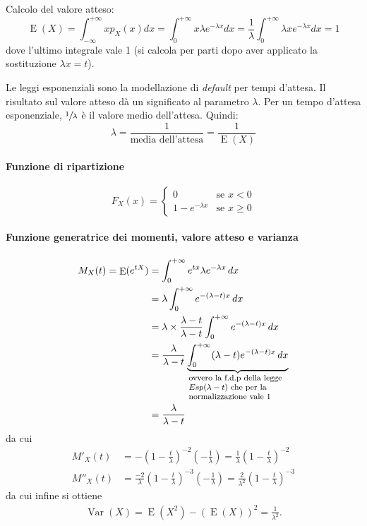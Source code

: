 \documentclass[11pt,a4paper,twoside]{article}
\let\geq\geqslant%
\newcommand\dx{\,dx}
\newcommand{\explain}[2]{\underbrace{#1}_{\parbox{\widthof{\ensuremath{#1}}}{\footnotesize\raggedright #2}}}
\DeclareMathOperator{\Var}{Var}
\DeclareMathOperator{\E}{E}
\begin{document}
Calcolo del valore atteso:
\[
  \E(X) = \int_{-\infty}^{+\infty} x p_X(x) dx = \int_0^{+\infty} x
  \lambda e^{-\lambda x} dx = \frac{1}{\lambda} \int_0^{+\infty}
  \lambda x e^{-\lambda x} dx = 1
\]
dove l'ultimo integrale vale 1 (si calcola per parti dopo aver
applicato la sostituzione \(\lambda x = t\)).

Le leggi esponenziali sono la modellazione di \textit{default} per
tempi d'attesa.  Il risultato sul valore atteso dà un significato al
parametro \(\lambda\). Per un tempo d'attesa esponenziale,
\(\sfrac{1}{\lambda}\) è il valore medio dell'attesa. Quindi:
\[
  \lambda = \frac{1}{\mbox{media dell'attesa}} = \frac{1}{\E(X)}
\]

\paragraph{Funzione di ripartizione}
\[
  F_X(x) = \begin{cases}
    0 &\mbox{se } x < 0 \\
    1-e^{-\lambda x} &\mbox{se } x\geq 0
  \end{cases}
\]

\paragraph{Funzione generatrice dei momenti, valore atteso e varianza}
\begin{align*}
  M_X(t) = \E(e^{tX})
  &= \int_0^{+\infty} e^{tx} \lambda e^{-\lambda x} \dx \\
  &= \lambda \int_0^{+\infty} e^{-(\lambda - t)x} \dx \\
  &= \lambda \times \frac{\lambda -t}{\lambda -t} \int_0^{+\infty} e^{-(\lambda - t)x} \dx \\
  &= \frac{\lambda}{\lambda - t}
    \explain{\int_0^{+\infty} (\lambda -t)e^{-(\lambda -t)x} \dx}
    {ovvero la f.d.p\ della legge \(Esp(\lambda -t)\) che per la normalizzazione vale 1}\\
  &= \frac{\lambda}{\lambda -t}
\end{align*}
da cui
\begin{align*}
  M'_X(t)
  &= - \left( 1 - \frac{t}{\lambda} \right)^{-2}
    \left(-\frac{1}{\lambda}\right) =
    \frac{1}{\lambda} \left( 1 - \frac{t}{\lambda} \right)^{-2} \\
  M''_X(t)
  &= \frac{-2}{\lambda} \left( 1-\frac{t}{\lambda}
    \right)^{-3} \left( -\frac{1}{\lambda} \right) =
    \frac{2}{\lambda^2} \left( 1 - \frac{t}{\lambda} \right)^{-3}
\end{align*}
da cui infine si ottiene
\begin{align*}
  \Var(X) = \E(X^2) - (\E(X))^2 = \frac{1}{\lambda^2} .
\end{align*}
\end{document}

